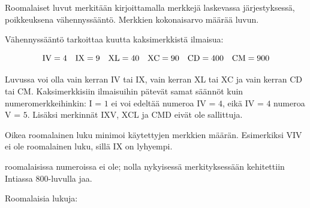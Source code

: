 Roomalaiset luvut merkitään kirjoittamalla merkkejä laskevassa järjestyksessä, poikkeuksena vähennyssääntö. Merkkien kokonaisarvo määrää luvun.

Vähennyssääntö tarkoittaa kuutta kaksimerkkistä ilmaisua:

\begin{equation*}
	\rm IV=4\quad
	IX=9\quad
	XL=40\quad
	XC=90\quad
	CD=400\quad
	CM=900
\end{equation*}

Luvussa voi olla vain kerran IV tai IX, vain kerran XL tai XC ja vain kerran CD tai CM.
Kaksimerkkisiin ilmaisuihin pätevät samat säännöt kuin numeromerkkeihinkin: I = $1$ ei voi edeltää numeroa IV = $4$, eikä IV = $4$ numeroa V = $5$.
Lisäksi merkinnät IXV, XCL ja CMD eivät ole sallittuja.

Oikea roomalainen luku minimoi käytettyjen merkkien määrän. Esimerkiksi VIV ei ole roomalainen luku, sillä IX on lyhyempi.

 roomalaisissa numeroissa ei ole; nolla nykyisessä merkityksessään kehitettiin Intiassa 800-luvulla jaa.

\begin{esimerkki}
	Roomalaisia lukuja:
\end{esimerkki}

